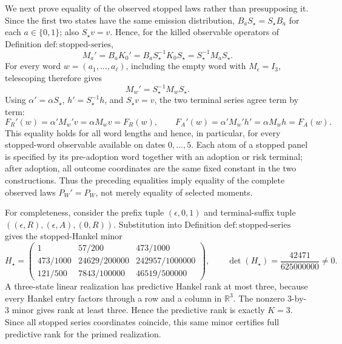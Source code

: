 We next prove equality of the observed stopped laws rather than presupposing it.  Since the first two states have the same emission distribution, \(B_aS_{\star}=S_{\star}B_a\) for each \(a\in\{0,1\}\); also \(S_{\star}v=v\).  Hence, for the killed observable operators of Definition \(\mathrm{def{:}stopped\text{-}series}\),
\[
 M_a'=B_aK_0'
 =B_aS_{\star}^{-1}K_0S_{\star}
 =S_{\star}^{-1}M_aS_{\star}.
\]
For every word \(w=(a_1,\ldots,a_\ell)\), including the empty word with \(M_\epsilon=I_3\), telescoping therefore gives
\[
 M_w'=S_{\star}^{-1}M_wS_{\star}.
\]
Using \(\alpha'=\alpha S_{\star}\), \(h'=S_{\star}^{-1}h\), and \(S_{\star}v=v\), the two terminal series agree term by term:
\[
 F_R'(w)=\alpha'M_w'v
 =\alpha M_wv=F_R(w),
 \qquad
 F_A'(w)=\alpha'M_w'h'
 =\alpha M_wh=F_A(w).
\]
This equality holds for all word lengths and hence, in particular, for every stopped-word observable available on dates \(0,\ldots,5\).  Each atom of a stopped panel is specified by its pre-adoption word together with an adoption or risk terminal; after adoption, all outcome coordinates are the same fixed constant in the two constructions.  Thus the preceding equalities imply equality of the complete observed laws \(P_W'=P_W\), not merely equality of selected moments.

For completeness, consider the prefix tuple \((\epsilon,0,1)\) and terminal-suffix tuple \(((\epsilon,R),(\epsilon,A),(0,R))\).  Substitution into Definition \(\mathrm{def{:}stopped\text{-}series}\) gives the stopped-Hankel minor
\[
 H_\star=
 \begin{pmatrix}
 1&57/200&473/1000\\
 473/1000&24629/200000&242957/1000000\\
 121/500&7843/100000&46519/500000
 \end{pmatrix},
 \qquad
 \det(H_\star)=\frac{42471}{625000000}\ne0.
\]
A three-state linear realization has predictive Hankel rank at most three, because every Hankel entry factors through a row and a column in \(\mathbb R^3\).  The nonzero \(3\)-by-\(3\) minor gives rank at least three.  Hence the predictive rank is exactly \(K=3\).  Since all stopped series coordinates coincide, this same minor certifies full predictive rank for the primed realization.


